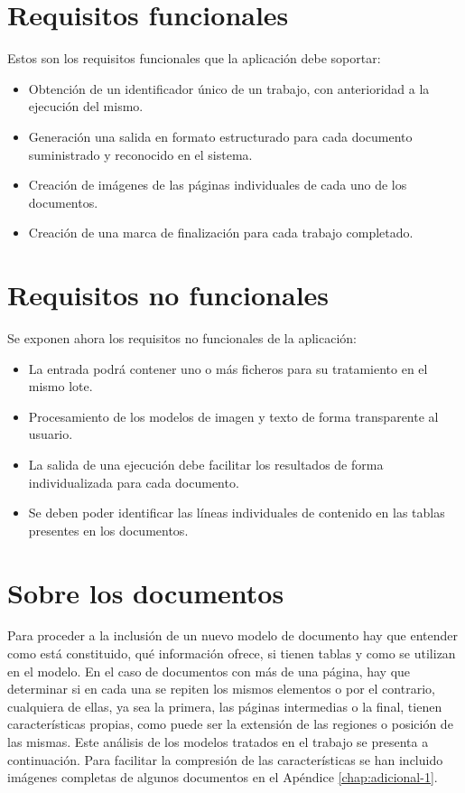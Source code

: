 \section{Requisitos funcionales}

Estos son los requisitos funcionales que la aplicación debe soportar:

\begin{itemize}
	\item Obtención de un identificador único de un trabajo, con anterioridad a la ejecución del mismo.
	\item Generación una salida en formato estructurado para cada documento suministrado y reconocido en el sistema.
	\item Creación de imágenes de las páginas individuales de cada uno de los documentos.
	\item Creación de una marca de finalización para cada trabajo completado.
\end{itemize}


\section{Requisitos no funcionales}

Se exponen ahora los requisitos no funcionales de la aplicación:

\begin{itemize}
	\item La entrada podrá contener uno o más ficheros para su tratamiento en el mismo lote.
	\item Procesamiento de los modelos de imagen y texto de forma transparente al usuario.
	\item La salida de una ejecución debe facilitar los resultados de forma individualizada para cada documento.
	\item Se deben poder identificar las líneas individuales de contenido en  las tablas presentes en los documentos.
\end{itemize}

\section{Sobre los documentos}
\label{sec:sobre-los-documentos}

Para proceder a la inclusión de un nuevo modelo de documento hay que entender como está constituido, qué información ofrece, si tienen tablas y como se utilizan en el modelo. En el caso de documentos con más de una página, hay que determinar si en cada una se repiten los mismos elementos o por el contrario, cualquiera de ellas, ya sea la primera, las páginas intermedias o la final, tienen características propias, como puede ser la extensión de las regiones o posición de las mismas. Este análisis de los modelos tratados en el trabajo se presenta a continuación. Para facilitar la compresión de las características se han incluido imágenes completas de algunos documentos en el Apéndice \ref{chap:adicional-1}.

